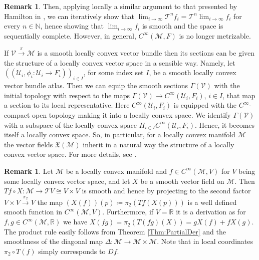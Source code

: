 \documentclass[12pt,a4paper]{article}
\theoremstyle{plain}
\theoremstyle{definition}
\newtheorem{remark}[theorem]{Remark}
\newcommand{\R}{\mathbb{R}}
\newcommand{\N}{\mathbb{N}}
\newcommand{\Mcal}{\mathcal{M}}
\newcommand{\Ucal}{\mathcal{U}}
\begin{document}
\begin{remark}
Then, applying locally a similar argument to that presented by Hamilton in \cite[p.~38 (lemma)]{hamilton1977deformation}, we can iteratively show that $\lim_{i\to \infty}\mathcal T^n f_i=\mathcal{T}^n\lim_{i\to \infty}f_i$ for every $n\in \N$, hence showing that $\lim_{i\to \infty}f_i$ is smooth and the space is sequentially complete. However, in general, $C^\infty(\Mcal,F)$ is no longer metrizable.

If $\mathcal{V}\xrightarrow{\pi} \mathcal{M}$ is a smooth locally convex vector bundle then its sections can be given the structure of a locally convex vector space in a sensible way. Namely, let 
$((\Ucal_i,\phi_i:\Ucal_i\to F_i))_{i\in I}$, for some index set $I$, be a smooth locally convex vector bundle atlas. Then we can equip the smooth sections $\Gamma(\mathcal V)$ with the initial topology with respect to the maps $\Gamma(\mathcal{V})\to C^\infty(\Ucal_i,F_i)$, $i\in I$, that map a section to its local representative. Here $C^\infty(\Ucal_i,F_i)$ is equipped with the $C^\infty$-compact open topology making it into a locally convex space. We identify $\Gamma(\mathcal V)$ with a subspace of the locally convex space $\Pi_{i\in I}C^\infty(\Ucal_i,F_i)$. Hence, it becomes itself a locally convex space. So, in particular, for a locally convex manifold $\Mcal$ the vector fields $\mathfrak{X}(\mathcal{M})$ inherit in a natural way the structure of a locally convex vector space. For more details, see \cite[p.~216, C.7]{schmeding_2022}.
\end{remark}

\begin{remark}
\label{Rem:X(f)}
Let $\Mcal$ be a locally convex manifold and $f\in C^\infty(\Mcal,V)$ for $V$ being some locally convex vector space, and let $X$ be a smooth vector field on $\Mcal$. Then $Tf\circ X:\Mcal\to \mathcal{T}V\cong V\times V$ is smooth and hence by projecting to the second factor $V\times V\xrightarrow{\pi_2}V$ the map $(X(f))(p)\coloneqq \pi_2(Tf(X(p)))$ is a well defined smooth function in $C^\infty(\Mcal,V)$. Furthermore, if $V=\R$ it is a derivation as for $f,g\in C^\infty(\Mcal,\R)$ we have $X(fg)=\pi_2(T(fg)(X))=gX(f)+fX(g)$. The product rule easily follows from Theorem \ref{Thm:PartialDer} and the smoothness of the diagonal map $\Delta:\Mcal\to \Mcal\times\Mcal$. Note that in local coordinates $\pi_2\circ T(f)$ simply corresponds to $Df$. 
\end{remark}
\end{document}
